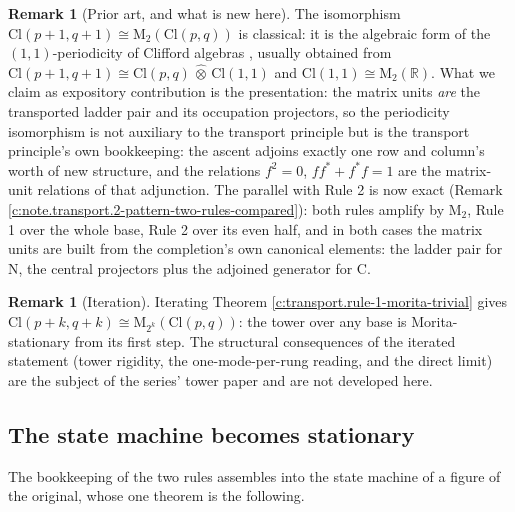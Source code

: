 \documentclass[11pt]{article}
\theoremstyle{definition}
\newtheorem{remark}[theorem]{Remark}
\theoremstyle{plain}
\providecommand{\Cl}{}\renewcommand{\Cl}{\mathrm{Cl}}
\providecommand{\Mat}{}\renewcommand{\Mat}{\mathrm{M}}
\providecommand{\R}{}\renewcommand{\R}{\mathbb{R}}
\begin{document}
\begin{remark}[Prior art, and what is new here]\label{c:note.transport.prior-art-what-new-here}
The isomorphism $\Cl(p{+}1,q{+}1) \cong \Mat_2(\Cl(p,q))$ is classical: it is the algebraic form of the $(1,1)$-periodicity of Clifford algebras \cite{ABS1964, Porteous1995, Lounesto2001}, usually obtained from $\Cl(p{+}1,q{+}1) \cong \Cl(p,q)\,\hat{\otimes}\,\Cl(1,1)$ and $\Cl(1,1) \cong \Mat_2(\R)$. What we claim as expository contribution is the presentation: the matrix units \emph{are} the transported ladder pair and its occupation projectors, so the periodicity isomorphism is not auxiliary to the transport principle but is the transport principle's own bookkeeping: the ascent adjoins exactly one row and column's worth of new structure, and the relations $f^2 = 0$, $ff^* + f^*f = 1$ are the matrix-unit relations of that adjunction. The parallel with Rule 2 is now exact (Remark \ref{c:note.transport.2-pattern-two-rules-compared}): both rules amplify by $\Mat_2$, Rule 1 over the whole base, Rule 2 over its even half, and in both cases the matrix units are built from the completion's own canonical elements: the ladder pair for N, the central projectors plus the adjoined generator for C.
\end{remark}

\begin{remark}[Iteration]\label{c:note.transport.iteration}
Iterating Theorem \ref{c:transport.rule-1-morita-trivial} gives $\Cl(p{+}k, q{+}k) \cong \Mat_{2^k}(\Cl(p,q))$: the tower over any base is Morita-stationary from its first step. The structural consequences of the iterated statement (tower rigidity, the one-mode-per-rung reading, and the direct limit) are the subject of the series' tower paper \cite{ButlerT3} and are not developed here.
\end{remark}

\subsection*{The state machine becomes stationary}
\label{c:note.transport.setting-state-machine-becomes-stationary}
The bookkeeping of the two rules assembles into the state machine of a figure of the original, whose one theorem is the following.
\end{document}
